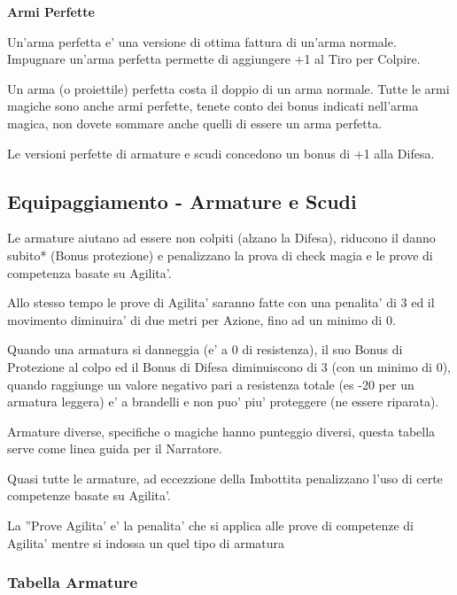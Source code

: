 \documentclass[a4paper,11pt,twoside,openany]{book}
\begin{document}
{\medskip

\textbf{Armi Perfette}
	
Un'arma perfetta e' una versione di ottima fattura di un'arma normale.
Impugnare un'arma perfetta permette di aggiungere +1 al Tiro per Colpire.
	
Un arma (o proiettile) perfetta costa il doppio di un arma normale. 
Tutte le armi magiche sono anche armi perfette, tenete conto dei bonus 	indicati nell'arma magica, non dovete sommare anche quelli di essere un arma perfetta.
		
Le versioni perfette di armature e scudi concedono un bonus di +1 alla Difesa.



\pagebreak

\subsection{Equipaggiamento - Armature e Scudi}

\label{equipaggiamento---armature-e-scudi}

Le armature aiutano ad essere non colpiti (alzano la Difesa), riducono il danno subito{*} (Bonus protezione) e penalizzano la prova di check magia e le prove di competenza basate su Agilita'.

Allo stesso tempo le prove di Agilita' saranno fatte con una penalita' di 3 ed il movimento diminuira' di due metri per Azione, fino ad un minimo di 0.

Quando una armatura si danneggia (e' a 0 di resistenza), il suo Bonus di Protezione al colpo ed il Bonus di Difesa diminuiscono di 3 (con un minimo di 0), quando raggiunge un valore negativo pari a resistenza totale (es -20 per un armatura leggera) e' a brandelli e non puo' piu' proteggere (ne essere riparata).

Armature diverse, specifiche o magiche hanno punteggio diversi, questa tabella serve come linea guida per il Narratore.

Quasi tutte le armature, ad eccezzione della Imbottita penalizzano l'uso di certe competenze basate su Agilita'. 

La ''Prove Agilita' e' la penalita' che si applica alle prove di competenze di Agilita' mentre si indossa un quel tipo di armatura 

\subsubsection{Tabella Armature}
\medskip

}
\end{document}
